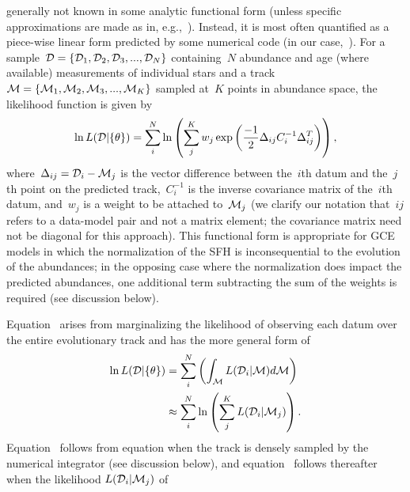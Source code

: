\documentclass[ms.tex]{subfiles}
\begin{document}
generally not known in some analytic functional form (unless specific
approximations are made as in, e.g.,~\citealp{Weinberg2017}).
Instead, it is most often quantified as a piece-wise linear form predicted by
some numerical code (in our case,~\vice).
For a sample~$\mathcal{D} = \{\mathcal{D}_1, \mathcal{D}_2, \mathcal{D}_3, ...,
\mathcal{D}_N\}$ containing~$N$ abundance and age (where available) measurements
of individual stars and a track~$\mathcal{M} = \{\mathcal{M}_1, \mathcal{M}_2,
\mathcal{M}_3, ..., \mathcal{M}_K\}$ sampled at~$K$ points in abundance space,
the likelihood function is given by
\begin{equation}
\ln L(\mathcal{D} | \{\theta\}) = \sum_i^N \ln \left(
\sum_j^K w_j \exp\left(
\frac{-1}{2}\Delta_{ij}C_i^{-1}\Delta_{ij}^T
\right)
\right),
\label{eq:likelihood}
\end{equation}
where~$\Delta_{ij} = \mathcal{D}_i - \mathcal{M}_j$ is the vector difference
between the~$i$th datum and the~$j$th point on the predicted track,~$C_i^{-1}$
is the inverse covariance matrix of the~$i$th datum, and~$w_j$ is a weight to
be attached to~$\mathcal{M}_j$ (we clarify our notation that~$ij$ refers to a
data-model pair and not a matrix element; the covariance matrix need not be
diagonal for this approach).
This functional form is appropriate for GCE models in which the normalization
of the SFH is inconsequential to the evolution of the abundances; in the
opposing case where the normalization does impact the predicted abundances,
one additional term subtracting the sum of the weights is required (see
discussion below).
\par
Equation~ arises from marginalizing the likelihood of
observing each datum over the entire evolutionary track and has the more
general form of
\begin{subequations}\begin{align}
\ln L(\mathcal{D} | \{\theta\}) &= \sum_i^N \left(
\int_{\mathcal{M}} L(\mathcal{D}_i | \mathcal{M}) d\mathcal{M}
\right)
\label{eq:likelihood_general_int}
\\
&\approx \sum_i^N \ln \left(
\sum_j^K L(\mathcal{D}_i | \mathcal{M}_j)\right).
\label{eq:likelihood_general}
\end{align}\end{subequations}
Equation~ follows from equation
 when the track is densely sampled by the
numerical integrator (see discussion below), and equation~
follows thereafter when the likelihood $L(\mathcal{D}_i | \mathcal{M}_j)$ of
\end{document}
